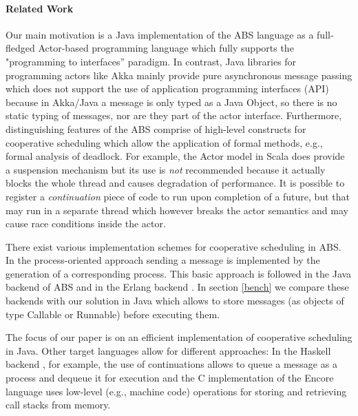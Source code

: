 \paragraph{Related Work}

Our main motivation is a Java implementation of the ABS language as a full-fledged Actor-based programming language which fully supports the "programming to interfaces'' paradigm.
In contrast, Java libraries for programming actors like Akka \cite{Akka} mainly provide pure asynchronous message passing which does not support the use of application programming interfaces (API) because in Akka/Java a message is only typed as a Java Object, so there is no static typing of messages, nor are they part of the actor interface.
Furthermore, distinguishing features of the ABS comprise of high-level constructs for cooperative scheduling which allow the application of formal methods, e.g.,
formal analysis of deadlock\cite{deadlock}.
For example, the Actor model in Scala \cite{Scala} does provide a suspension mechanism but its use is \emph{not} recommended because it actually blocks the whole thread and causes
degradation of performance.
It is possible to register a {\em continuation} piece of code to run upon completion of a future, but that may run in a separate thread which however breaks the actor semantics and may cause race conditions inside the actor.

There exist various implementation schemes for cooperative scheduling in ABS.
In the process-oriented approach sending a message is implemented by the generation of a corresponding process. This basic approach is followed in the Java backend of ABS \cite{abs,Schafer} and in the Erlang backend \cite{Erlang}.
In section \ref{bench} we compare these backends with our solution in Java which allows to store messages (as objects of type Callable or Runnable) before executing them.

The focus of our paper is on an efficient implementation of cooperative scheduling in Java.
Other target languages allow for different approaches:
In the Haskell backend \cite{Haskell}, for example, the use of continuations allows
to queue a message as a process and dequeue it for execution and the C implementation of the
Encore language \cite{Encore} uses low-level (e.g., machine code) operations for
storing and retrieving call stacks from memory.






